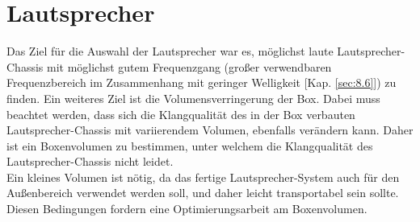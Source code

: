 \section{Lautsprecher}\label{subsec:2.1.2}
Das Ziel für die Auswahl der Lautsprecher war es, möglichst laute Lautsprecher-Chassis mit möglichst gutem Frequenzgang (großer verwendbaren Frequenzbereich im Zusammenhang mit geringer Welligkeit [Kap. \ref{sec:8.6}]) zu finden.
Ein weiteres Ziel ist die Volumensverringerung der Box.
Dabei muss beachtet werden, dass sich die Klangqualität des in der Box verbauten Lautsprecher-Chassis mit variierendem Volumen, ebenfalls verändern kann.
Daher ist ein Boxenvolumen zu bestimmen, unter welchem die Klangqualität des Lautsprecher-Chassis nicht leidet.\\
Ein kleines Volumen ist nötig, da das fertige Lautsprecher-System auch für den Außenbereich verwendet werden soll, und daher leicht transportabel sein sollte.
Diesen Bedingungen fordern eine Optimierungsarbeit am Boxenvolumen.